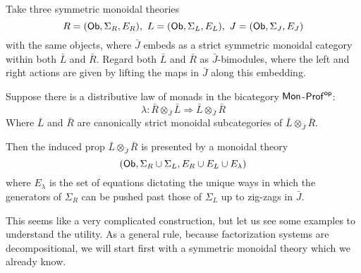 %
%
%
%
%
%
%
%
%
\begin{lemma}
Take three symmetric monoidal theories
$$
R=({\sf Ob},\Sigma_R ,E_R ), \ L=({\sf Ob},\Sigma_L ,E_L ),  \ J=({\sf Ob},\Sigma_J ,E_J )
$$
with the same objects, where $\bar{J}$ embeds as a strict symmetric monoidal category within both $\bar{L}$ and $\bar{R}$.  Regard both $\bar{L}$ and $\bar{R}$ as  $\bar{J}$-bimodules, where the left and right actions are given by lifting the maps in $\bar{J}$ along this embedding.

Suppose there is a distributive law of monads in the bicategory ${\sf Mon}$-${\sf Prof}^{\mathsf{op}}$:
$$
\lambda:\bar{R}\otimes_{\bar{J}} \bar{L}\Rightarrow \bar{L}\otimes_{\bar{J}} \bar{R}
$$
Where $\bar{L}$ and $\bar{R}$ are canonically strict monoidal subcategories of $\bar{L}\otimes_{\bar{J}} \bar{R}$.

Then the induced prop $\bar{L}\otimes_{\bar{J}} \bar{R}$ is presented by a monoidal theory
$$
({\sf Ob}, \Sigma_R\cup \Sigma_L, E_R\cup E_L \cup E_\lambda)
$$
where $E_\lambda$ is the set of equations dictating the unique ways in which the generators of $\Sigma_R$ can be pushed past those of $\Sigma_L$ up to zig-zags in $\bar{J}$.
\end{lemma}
This seems like a very complicated construction, but let us see some examples to understand the utility.  As a general rule, because factorization systems are decompositional, we will start first with a symmetric monoidal theory which we already know.
